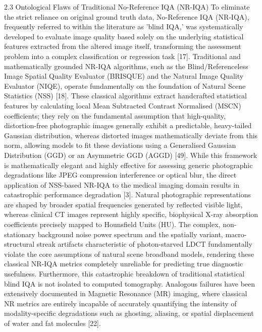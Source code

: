2.3 Ontological Flaws of Traditional No-Reference IQA (NR-IQA) To eliminate the strict reliance on original ground truth data, No-Reference IQA (NR-IQA), frequently referred to within the literature as 'blind IQA,' was systematically developed to evaluate image quality based solely on the underlying statistical features extracted from the altered image itself, transforming the assessment problem into a complex classification or regression task [17]. Traditional and mathematically grounded NR-IQA algorithms, such as the Blind/Referenceless Image Spatial Quality Evaluator (BRISQUE) and the Natural Image Quality Evaluator (NIQE), operate fundamentally on the foundation of Natural Scene Statistics (NSS) [18]. These classical algorithms extract handcrafted statistical features by calculating local Mean Subtracted Contrast Normalised (MSCN) coefficients; they rely on the fundamental assumption that high-quality, distortion-free photographic images generally exhibit a predictable, heavy-tailed Gaussian distribution, whereas distorted images mathematically deviate from this norm, allowing models to fit these deviations using a Generalised Gaussian Distribution (GGD) or an Asymmetric GGD (AGGD) [49]. While this framework is mathematically elegant and highly effective for assessing generic photographic degradations like JPEG compression interference or optical blur, the direct application of NSS-based NR-IQA to the medical imaging domain results in catastrophic performance degradation [3]. Natural photographic representations are shaped by broader spatial frequencies generated by reflected visible light, whereas clinical CT images represent highly specific, biophysical X-ray absorption coefficients precisely mapped to Hounsfield Units (HU). The complex, non-stationary background noise power spectrum and the spatially variant, macro-structural streak artifacts characteristic of photon-starved LDCT fundamentally violate the core assumptions of natural scene broadband models, rendering these classical NR-IQA metrics completely unreliable for predicting true diagnostic usefulness. Furthermore, this catastrophic breakdown of traditional statistical blind IQA is not isolated to computed tomography. Analogous failures have been extensively documented in Magnetic Resonance (MR) imaging, where classical NR metrics are entirely incapable of accurately quantifying the intensity of modality-specific degradations such as ghosting, aliasing, or spatial displacement of water and fat molecules [22].
